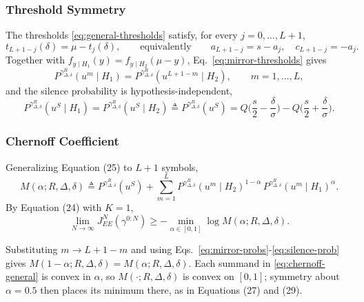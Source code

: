 \documentclass[11pt]{article}
\begin{document}
\subsubsection*{Threshold Symmetry}
 
The thresholds \eqref{eq:general-thresholds} satisfy, for every
$j=0,\dots,L+1$,
\begin{equation}
t_{L+1-j}(\delta) = \mu - t_j(\delta), \qquad \text{equivalently} \qquad
a_{L+1-j} = s - a_j, \quad c_{L+1-j} = -a_j.
\label{eq:mirror-thresholds}
\end{equation}
Together with $f_{y\mid H_1}(y) = f_{y\mid H_2}(\mu-y)$,
Eq.~\eqref{eq:mirror-thresholds} gives
\begin{equation}
P^{\gamma^R_{\Delta,\delta}}(u^m\mid H_1) = P^{\gamma^R_{\Delta,\delta}}(u^{L+1-m}\mid H_2),
\qquad m=1,\dots,L,
\label{eq:mirror-probs}
\end{equation}
and the silence probability is hypothesis-independent,
\begin{equation}
P^{\gamma^R_{\Delta,\delta}}(u^S\mid H_1) = P^{\gamma^R_{\Delta,\delta}}(u^S\mid H_2)
\triangleq P^{\gamma^R_{\Delta,\delta}}(u^S)
= Q\Big(\frac{s}{2}-\frac{\delta}{\sigma}\Big) - Q\Big(\frac{s}{2}+\frac{\delta}{\sigma}\Big).
\label{eq:silence-prob}
\end{equation}
 
\subsubsection*{Chernoff Coefficient}
 
Generalizing Equation (25) to $L+1$ symbols,
\begin{equation}
M(\alpha; R,\Delta,\delta) \triangleq P^{\gamma^R_{\Delta,\delta}}(u^S)
+ \sum_{m=1}^{L} P^{\gamma^R_{\Delta,\delta}}(u^m\mid H_2)^{1-\alpha}\,
P^{\gamma^R_{\Delta,\delta}}(u^m\mid H_1)^{\alpha}.
\label{eq:chernoff-general}
\end{equation}
By Equation (24) with $K=1$,
\begin{equation}
\lim_{N\to\infty} J_{EE}^N(\gamma^{0:N}) \ge
-\min_{\alpha\in[0,1]} \log M(\alpha; R,\Delta,\delta).
\label{eq:general-bound-alpha}
\end{equation}
 
Substituting $m \to L+1-m$ and using
Eqs.~\eqref{eq:mirror-probs}-\eqref{eq:silence-prob} gives
$M(1-\alpha;R,\Delta,\delta) = M(\alpha;R,\Delta,\delta)$. Each summand in
\eqref{eq:chernoff-general} is convex in $\alpha$, so
$M(\cdot;R,\Delta,\delta)$ is convex on $[0,1]$; symmetry about
$\alpha=0.5$ then places its minimum there, as in Equations (27) and (29).
 
\end{document}
